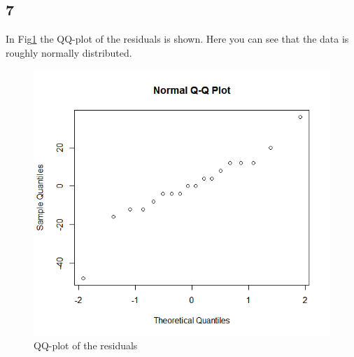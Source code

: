 \documentclass{article}
\begin{document}
    \subsection*{7}
      In Fig\ref{fig:QQRes} the QQ-plot of the residuals is shown.
      Here you can see that the data is roughly normally distributed.
      \begin{figure}[H]
          \centering
          \includegraphics[scale=0.4]{../results/QQResEnvHum.png} 
          \caption{QQ-plot of the residuals}
          \label{fig:QQRes}
      \end{figure}
    
\end{document}
